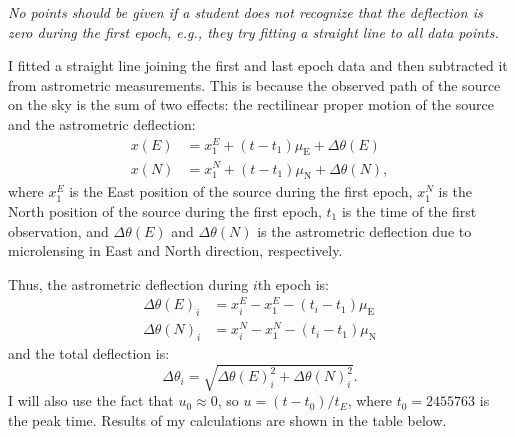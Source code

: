 \begin{description}
  \emph{No points should be given if a student does not recognize that the
  deflection is zero during the first epoch, e.g., they try fitting a
  straight line to all data points.}

\item[(f)] I fitted a straight line joining the first and last epoch data
  and then subtracted it from astrometric measurements. This is because the
  observed path of the source on the sky is the sum of two effects: the
  rectilinear proper motion of the source and the astrometric deflection:
  \begin{align*}
    x(E) &= x_1^E + (t - t_1)\mu_{\mathrm{E}} + \Delta\theta(E)\\
    x(N) &= x_1^N + (t - t_1)\mu_{\mathrm{N}} + \Delta\theta(N),
  \end{align*}
  where $x_1^E$ is the East position of the source during the first epoch,
  $x_1^N$ is the North position of the source during the first epoch, $t_1$
  is the time of the first observation, and $\Delta\theta(E)$ and
  $\Delta\theta(N)$ is the astrometric deflection due to microlensing in
  East and North direction, respectively.

  Thus, the astrometric deflection during $i$th epoch is:
  \begin{align*}
    \Delta\theta(E)_i &= x_i^E - x_1^E - (t_i - t_1)\mu_{\mathrm{E}}\\
    \Delta\theta(N)_i &= x_i^N - x_1^N - (t_i - t_1)\mu_{\mathrm{N}}
  \end{align*}
  and the total deflection is:
  \[
    \Delta\theta_i = \sqrt{\Delta\theta(E)_i^2 + \Delta\theta(N)_i^2}.
  \]
  I will also use the fact that $u_0 \approx 0$, so
  $u = (t - t_0)/t_E$, where $t_0 = 2455763$ is the peak time. Results of
  my calculations are shown in the table below.


\end{description}
